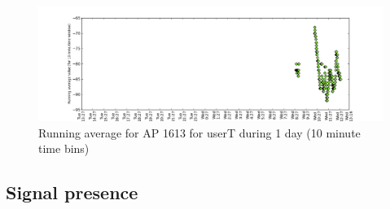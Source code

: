 \begin{figure}[!h]
\centering
\includegraphics[width
=\textwidth]{figures/rn_avg/user_1_sorted_1days_plot_1613_rn_avg_sig_10.png}
\caption{Running average for AP 1613 for userT during 1 day (10 minute time
bins)}
\label{user_1_AP1613_rn10avg_1d}
\end{figure}

\subsection{Signal presence}